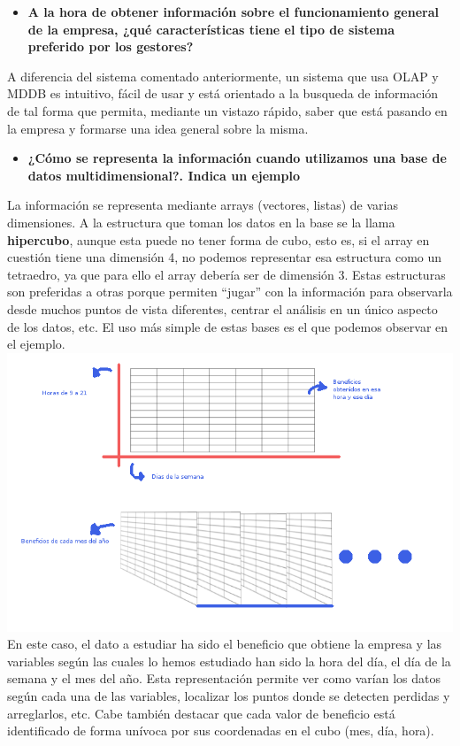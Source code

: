 \documentclass[paper=a4, fontsize=11pt]{scrartcl} %
\begin{document}
\begin{itemize}
\item \textbf{A la hora de obtener información sobre el funcionamiento general de la empresa, ¿qué características tiene el tipo de sistema preferido 	 por los gestores?}
\end{itemize}
A diferencia del sistema comentado anteriormente, un sistema que usa OLAP y MDDB es intuitivo, fácil de usar y está orientado a la busqueda de información de tal forma que permita, mediante un vistazo rápido, saber que está pasando en la empresa y formarse una idea general sobre la misma.
\begin{itemize}
\item \textbf{¿Cómo se representa la información cuando utilizamos una base de datos multidimensional?. Indica un ejemplo}
\end{itemize}
La información se representa mediante arrays (vectores, listas) de varias dimensiones. A la estructura que toman los datos en la base se la llama \textbf{hipercubo}, aunque esta puede no tener forma de cubo, esto es, si el array en cuestión tiene una dimensión 4, no podemos representar esa estructura como un tetraedro, ya que para ello el array debería ser de dimensión 3. Estas estructuras son preferidas a otras porque permiten ``jugar'' con la información para observarla desde muchos puntos de vista diferentes, centrar el análisis en un único aspecto de los datos, etc. El uso más simple de estas bases es el que podemos observar en el ejemplo.
\includegraphics[scale=0.75]{ejemplo}
\newline
En este caso, el dato a estudiar ha sido el beneficio que obtiene la empresa y las variables según las cuales lo hemos estudiado han sido la hora del día, el día de la semana y el mes del año. Esta representación permite ver como varían los datos según cada una de las variables, localizar los puntos donde se detecten perdidas y arreglarlos, etc. Cabe también destacar que cada valor de beneficio está identificado de forma unívoca por sus coordenadas en el cubo (mes, día, hora).
\end{document}
